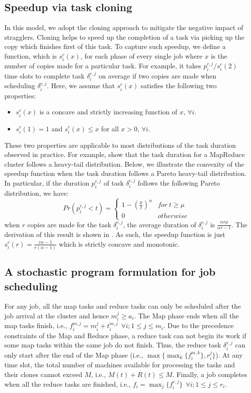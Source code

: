 \documentclass[10pt,conference,compsocconf,letterpaper]{IEEEtran}
\begin{document}
\subsection{Speedup via task cloning}
In this model, we adopt the cloning approach to mitigate the negative 
impact of stragglers. Cloning helps to speed up the completion of a task via picking up the copy which finishes first of this task.
To capture such speedup, we define a function, which is $s^c_i(x)$,  for each phase of every single job where $x$ is the number of copies made for a particular task. For example, it takes $p_i^{c,j}/s^c_i(2)$ time slots to complete task $\delta_i^{c,j}$ on average if two copies are made when scheduling $\delta_i^{c,j}$. Here, we assume that $s^c_i(x)$ satisfies the following two properties:
\begin{itemize}
\item $s^c_i(x)$ is a concave and strictly increasing function of $x$, $\forall i$.
\item $s^c_i(1)=1$ and $s^c_i(x) \leq x$ for all $x > 0$, $\forall i$.
\end{itemize}
These two properties are applicable to most distributions of the task duration observed in practice. For example, 
\cite{Outliers,speculative-multiple-optimization} show that the task duration for a MapReduce cluster follows a heavy-tail distribution.  Below, we illustrate the convexity of 
the speedup function when the task duration follows a Pareto heavy-tail distribution.  In particular, if the duration $p_i^{c,j}$ of task $\delta_i^{c,j}$ follows the following Pareto distribution, we have:
$$ Pr(p_i^{c,j} < t) = \left\{\begin{array}{cc}
1-(\frac{\mu}{t})^{\alpha} & for \ t \geq \mu\\
0 & otherwise
\end{array}\right.$$
when $r$ copies are made for the task $\delta_i^{c,j}$, the average duration of $\delta_i^{c,j}$ is $\frac{\alpha r \mu}{\alpha r - 1}$. The derivation of this result is shown in \cite{speculative-single-optimization}. As such, the speedup function is just $s_i^c(r) = \frac{r\alpha - 1}{r(\alpha-1)} $ which is strictly concave and
monotonic.

\subsection{A stochastic program formulation for job scheduling}
For any job, all the map tasks and reduce tasks can only be scheduled after the job arrival at the cluster and hence $m^{j}_{i} \geq a_{i}$. The Map phase ends when all the map tasks finish, i.e.,  $f_{i}^{m,j} =m^{j}_{i} + t^{m,j}_i \ \  \forall i;1\leq j \leq m_i$. Due to the precedence constraints of the Map and Reduce phase, a reduce task can not begin its work if some map tasks within the same job do not finish. Thus, the reduce task $\delta_i^{r,j}$ can only start after the end of the Map phase (i.e., $\max \{ \max_{k} \{ f_{i}^{m,k} \} ,r^{j}_{i} \}$). At any time slot, the total number of machines available for processing the tasks and their clones cannot exceed $M$, i.e., $M(t) + R(t) \leq M$. Finally, a job completes when all the reduce tasks are finished, i.e.,  $f_{i} = \max_{j} \{ f_{i}^{r,j} \} \ \ \forall i;1\leq j \leq r_i$.
\end{document}
